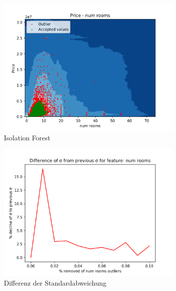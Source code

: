 \begin{figure}[h]
\begin{subfigure}{.5\textwidth}
  \includegraphics[width=\linewidth]{images/anhang/outlier_detection/num_rooms_IsolationForest.png}
  \caption{Isolation Forest} 
\end{subfigure}
\begin{subfigure}{.5\textwidth}
  \centering
  \includegraphics[width=\linewidth]{images/anhang/outlier_detection/num_rooms_diff_of_std.png}
  \caption{Differenz der Standardabweichung} 
\end{subfigure}
\begin{subfigure}{.5\textwidth}
  \centering

\end{subfigure}
\end{figure}
